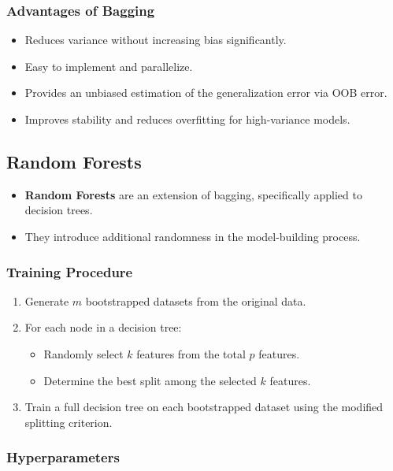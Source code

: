 \documentclass{article}
\begin{document}
\subsubsection{Advantages of Bagging}

\begin{itemize}
    \item Reduces variance without increasing bias significantly.
    \item Easy to implement and parallelize.
    \item Provides an unbiased estimation of the generalization error via OOB error.
    \item Improves stability and reduces overfitting for high-variance models.
\end{itemize}

\subsection{Random Forests}

\begin{itemize}
    \item \textbf{Random Forests} are an extension of bagging, specifically applied to decision trees.
    \item They introduce additional randomness in the model-building process.
\end{itemize}

\subsubsection{Training Procedure}

\begin{enumerate}
    \item Generate $m$ bootstrapped datasets from the original data.
    \item For each node in a decision tree:
    \begin{itemize}
        \item Randomly select $k$ features from the total $p$ features.
        \item Determine the best split among the selected $k$ features.
    \end{itemize}
    \item Train a full decision tree on each bootstrapped dataset using the modified splitting criterion.
\end{enumerate}

\subsubsection{Hyperparameters}
\end{document}
